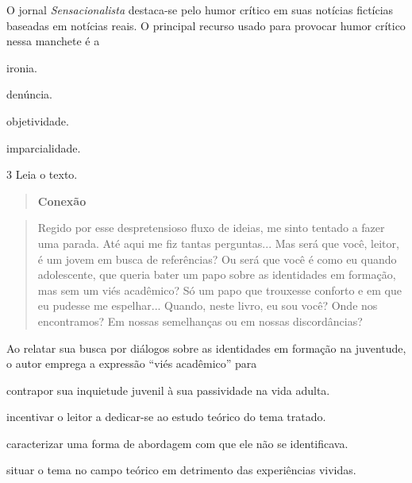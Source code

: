 O jornal \emph{Sensacionalista} destaca-se pelo humor crítico em suas
notícias fictícias baseadas em notícias reais. O principal recurso usado
para provocar humor crítico nessa manchete é a

\begin{escolha}
\item ironia.

\item denúncia.

\item objetividade.

\item imparcialidade.
\end{escolha}

\num{3} Leia o texto.

\begin{quote}
\centering\textbf{Conexão}
\end{quote}


\begin{quote}
Regido por esse despretensioso fluxo de ideias, me sinto tentado a fazer
uma parada. Até aqui me fiz tantas perguntas... Mas será que você,
leitor, é um jovem em busca de referências? Ou será que você é como eu
quando adolescente, que queria bater um papo sobre as identidades em
formação, mas sem um viés acadêmico? Só um papo que trouxesse conforto e
em que eu pudesse me espelhar... Quando, neste livro, eu sou você? Onde
nos encontramos? Em nossas semelhanças ou em nossas discordâncias?
\end{quote}


Ao relatar sua busca por diálogos sobre as identidades em formação na
juventude, o autor emprega a expressão ``viés acadêmico'' para

\begin{escolha}
\item contrapor sua inquietude juvenil à sua passividade na vida adulta.

\item incentivar o leitor a dedicar-se ao estudo teórico do tema tratado.

\item caracterizar uma forma de abordagem com que ele não se identificava.

\item situar o tema no campo teórico em detrimento das experiências
vividas.
\end{escolha}

